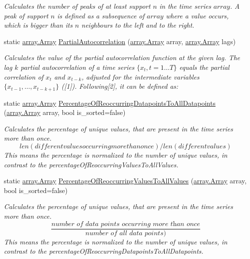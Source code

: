 \begin{DoxyCompactItemize}
\begin{DoxyCompactList}\small\item\em Calculates the number of peaks of at least support $n$ in the time series $array$. A peak of support $n$ is defined as a subsequence of $array$ where a value occurs, which is bigger than its $n$ neighbours to the left and to the right. \end{DoxyCompactList}\item 
static \mbox{\hyperlink{classkhiva_1_1array_1_1_array}{array.\+Array}} \mbox{\hyperlink{classkhiva_1_1features_1_1_features_a01ba2fa7975e7cddf82c93bf515856a6}{Partial\+Autocorrelation}} (\mbox{\hyperlink{classkhiva_1_1array_1_1_array}{array.\+Array}} array, \mbox{\hyperlink{classkhiva_1_1array_1_1_array}{array.\+Array}} lags)
\begin{DoxyCompactList}\small\item\em Calculates the value of the partial autocorrelation function at the given lag. The lag $k$ partial autocorrelation of a time series $\lbrace x_t, t = 1 \ldots T \rbrace$ equals the partial correlation of $x_t$ and $x_{t-k}$, adjusted for the intermediate variables $\lbrace x_ { t-1}, \ldots, x_{t-k+1} \rbrace$ (\mbox{[}1\mbox{]}). Following\mbox{[}2\mbox{]}, it can be defined as\+: \end{DoxyCompactList}\item 
static \mbox{\hyperlink{classkhiva_1_1array_1_1_array}{array.\+Array}} \mbox{\hyperlink{classkhiva_1_1features_1_1_features_a3405f05243a79947dd4aab24b63a38d5}{Percentage\+Of\+Reoccurring\+Datapoints\+To\+All\+Datapoints}} (\mbox{\hyperlink{classkhiva_1_1array_1_1_array}{array.\+Array}} array, bool is\+\_\+sorted=false)
\begin{DoxyCompactList}\small\item\em Calculates the percentage of unique values, that are present in the time series more than once. \[ len(different values occurring more than once) / len(different values) \] This means the percentage is normalized to the number of unique values, in contrast to the percentage\+Of\+Reoccurring\+Values\+To\+All\+Values. \end{DoxyCompactList}\item 
static \mbox{\hyperlink{classkhiva_1_1array_1_1_array}{array.\+Array}} \mbox{\hyperlink{classkhiva_1_1features_1_1_features_a9c60a397c28bf172ab54f0293a7260d5}{Percentage\+Of\+Reoccurring\+Values\+To\+All\+Values}} (\mbox{\hyperlink{classkhiva_1_1array_1_1_array}{array.\+Array}} array, bool is\+\_\+sorted=false)
\begin{DoxyCompactList}\small\item\em Calculates the percentage of unique values, that are present in the time series more than once. \[ \frac{\textit{number of data points occurring more than once}}{\textit{number of all data points})} \] This means the percentage is normalized to the number of unique values, in contrast to the percentage\+Of\+Reoccurring\+Datapoints\+To\+All\+Datapoints. \end{DoxyCompactList}\item 

\end{DoxyCompactItemize}
